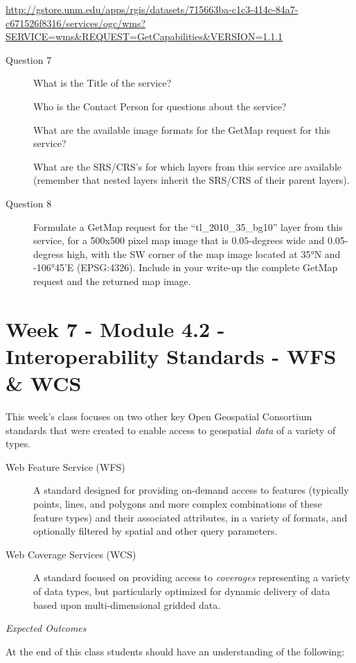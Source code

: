 \documentclass[]{book}
\begin{document}
\url{http://gstore.unm.edu/apps/rgis/datasets/715663ba-c1c3-414c-84a7-c671526f8316/services/ogc/wms?SERVICE=wms\&REQUEST=GetCapabilities\&VERSION=1.1.1}

\begin{description}
\item[Question 7]
What is the Title of the service?

Who is the Contact Person for questions about the service?

What are the available image formats for the GetMap request for this
service?

What are the SRS/CRS's for which layers from this service are available
(remember that nested layers inherit the SRS/CRS of their parent
layers).
\item[Question 8]
Formulate a GetMap request for the ``tl\_2010\_35\_bg10'' layer from
this service, for a 500x500 pixel map image that is 0.05-degrees wide
and 0.05-degress high, with the SW corner of the map image located at
35°N and -106°45'E (EPSG:4326). Include in your write-up the complete
GetMap request and the returned map image.
\end{description}

\chapter{Week 7 - Module 4.2 - Interoperability Standards - WFS \&
WCS}\label{week07}

This week's class focuses on two other key Open Geospatial Consortium
standards that were created to enable access to geospatial \emph{data}
of a variety of types.

\begin{description}
\item[Web Feature Service (WFS)]
A standard designed for providing on-demand access to features
(typically points, lines, and polygons and more complex combinations of
these feature types) and their associated attributes, in a variety of
formats, and optionally filtered by spatial and other query parameters.
\item[Web Coverage Services (WCS)]
A standard focused on providing access to \emph{coverages} representing
a variety of data types, but particularly optimized for dynamic delivery
of data based upon multi-dimensional gridded data.
\end{description}

\emph{Expected Outcomes}

At the end of this class students should have an understanding of the
following:
\end{document}
